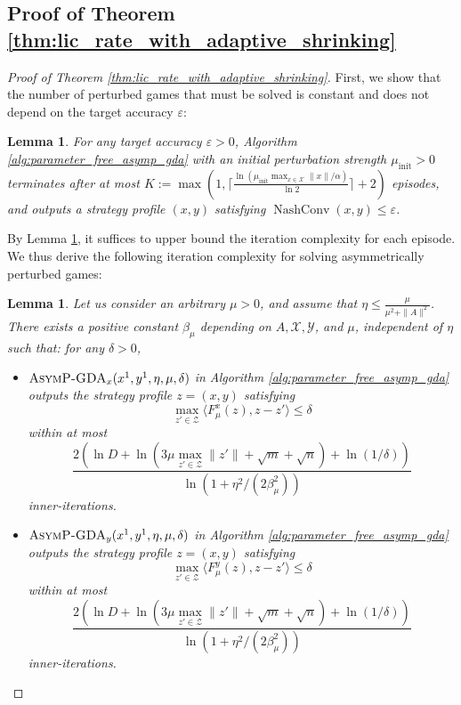 \documentclass{article}
\DeclareMathOperator{\NashConv}{NashConv}
\newcommand{\X}{\mathcal{X}}
\newcommand{\Y}{\mathcal{Y}}
\newcommand{\Z}{\mathcal{Z}}
\theoremstyle{plain}
\newtheorem{lemma}[theorem]{Lemma}
\begin{document}
\subsection{Proof of Theorem \ref{thm:lic_rate_with_adaptive_shrinking}}
\begin{proof}[Proof of Theorem \ref{thm:lic_rate_with_adaptive_shrinking}]
    First, we show that the number of perturbed games that must be solved is constant and does not depend on the target accuracy $\varepsilon$:

    \begin{lemma}
        For any target accuracy $\varepsilon > 0$, Algorithm \ref{alg:parameter_free_asymp_gda} with an initial perturbation strength $\mu_{\mathrm{init}} > 0$ terminates after at most $K:=\max\left(1, \lceil \frac{\ln (\mu_{\mathrm{init}}\max_{x\in \X}\|x\|/\alpha)}{\ln 2} \rceil + 2\right)$ episodes, and outputs a strategy profile $(x, y)$ satisfying $\NashConv(x, y)\leq \varepsilon$.
        \label{lem:upper_bound_on_number_of_episodes}
    \end{lemma}

    By Lemma \ref{lem:upper_bound_on_number_of_episodes}, it suffices to upper bound the iteration complexity for each episode.
    We thus derive the following iteration complexity for solving asymmetrically perturbed games:
    \begin{lemma}
        Let us consider an arbitrary $\mu > 0$, and assume that $\eta \leq \frac{\mu}{\mu^2 + \|A\|^2}$.
        There exists a positive constant $\beta_{\mu}$ depending on $A, \X, \Y$, and $\mu$, independent of $\eta$ such that: for any $\delta > 0$,
        \begin{itemize}
            \item $\textsc{AsymP-GDA}_x(x^1, y^1, \eta, \mu, \delta)$ in Algorithm \ref{alg:parameter_free_asymp_gda} outputs the strategy profile $z = (x, y)$ satisfying $$\max_{z'\in \Z}\langle F_{\mu}^x(z), z - z'\rangle \leq \delta$$ within at most $$\frac{ 2\left(\ln D + \ln \left(3\mu\max_{z'\in \Z}\|z'\| + \sqrt{m} + \sqrt{n}\right) + \ln (1 / \delta)\right)}{\ln \left(1 + \eta^2 / (2\beta_{\mu}^2)\right)}$$ inner-iterations.
            \item $\textsc{AsymP-GDA}_y(x^1, y^1, \eta, \mu, \delta)$ in Algorithm \ref{alg:parameter_free_asymp_gda} outputs the strategy profile $z = (x, y)$ satisfying $$\max_{z'\in \Z}\langle F_{\mu}^y(z), z - z'\rangle \leq \delta$$ within at most $$\frac{ 2\left(\ln D + \ln \left(3\mu\max_{z'\in \Z}\|z'\| + \sqrt{m} + \sqrt{n}\right) + \ln (1 / \delta)\right)}{\ln \left(1 + \eta^2 / (2\beta_{\mu}^2)\right)}$$ inner-iterations.
        \end{itemize}
        \label{lem:iteration_complexity_of_inner_loop}
    \end{lemma}


\end{proof}
\end{document}
